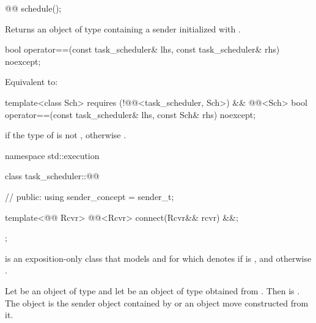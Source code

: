 %
\begin{itemdecl}
@@ schedule();
\end{itemdecl}
\begin{itemdescr}
\pnum
\effects
Returns an object of type  containing a sender
initialized with .
\end{itemdescr}

%
\begin{itemdecl}
bool operator==(const task_scheduler& lhs, const task_scheduler& rhs) noexcept;
\end{itemdecl}
\begin{itemdescr}
\pnum
\effects
Equivalent to: 
\end{itemdescr}

%
\begin{itemdecl}
template<class Sch>
  requires (!@@<task_scheduler, Sch>)
        && @@<Sch>
bool operator==(const task_scheduler& lhs, const Sch& rhs) noexcept;
\end{itemdecl}
\begin{itemdescr}
\pnum
\returns
{} if the type of  is not ,
otherwise .
\end{itemdescr}

\pnum
\begin{codeblock}
namespace std::execution {
  class task_scheduler::@@ {     // \expos
  public:
    using sender_concept = sender_t;

    template<@@ Rcvr>
      @@<Rcvr> connect(Rcvr&& rcvr) &&;
  };
}
\end{codeblock}
 is an exposition-only class that models
 and for which
 denotes
if  is , and
otherwise .

\pnum
Let  be an object of type 
and let  be an object of type  obtained
from .
Then 
is .
The object  is the sender object contained by
 or an object move constructed from it.

